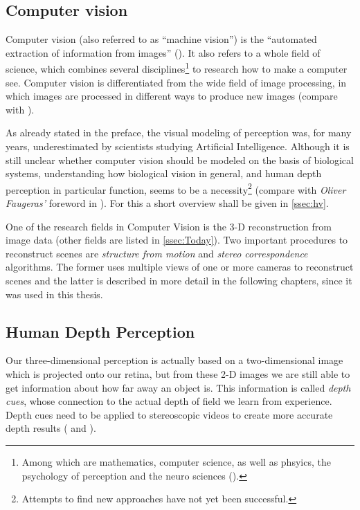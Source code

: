 \subsection{Computer vision}\label{ssec:cv}
Computer vision (also referred to as \enquote{machine vision}) is the \enquote{automated extraction of information from images} (\cite{Lowe.2016}). It also refers to a whole field of science, which combines several disciplines\footnote{Among which are mathematics, computer science, as well as phsyics, the psychology of perception and the neuro sciences (\cite[p.xi]{Hartley.2011}).} to research how to make a computer see. Computer vision is differentiated from the wide field of image processing, in which images are processed in different ways to produce new images (compare with \cite{Lowe.2016}).
 
As already stated in the preface, the visual modeling of perception was, for many years, underestimated by scientists studying Artificial Intelligence. Although it is still unclear whether computer vision should be modeled on the basis of biological systems, understanding how biological vision in general, and human depth perception in particular function, seems to be a necessity\footnote{Attempts to find new approaches have not yet been successful.} (compare with \textit{Oliver Faugeras'} foreword in \cite[p.xi]{Hartley.2011}). For this a short overview shall be given in \autoref{ssec:hv}.  

One of the research fields in Computer Vision is the 3-D reconstruction from image data (other fields are listed in \autoref{ssec:Today}). Two important procedures to reconstruct scenes are \textit{structure from motion} and \textit{stereo correspondence} algorithms. The former uses multiple views of one or more cameras to reconstruct scenes and the latter is described in more detail in the following chapters, since it was used in this thesis.

\subsection{Human Depth Perception}\label{ssec:hv}
Our three-dimensional perception is actually based on a two-dimensional image which is projected onto our retina, but from these 2-D images we are still able to get information about how far away an object is. This information is called \textit{depth cues}, whose connection to the actual depth of field we learn from experience. Depth cues need to be applied to stereoscopic videos to create more accurate depth results (\cite[p.226]{Goldstein.2015} and \cite[p.28]{Hottong.2009}). 

